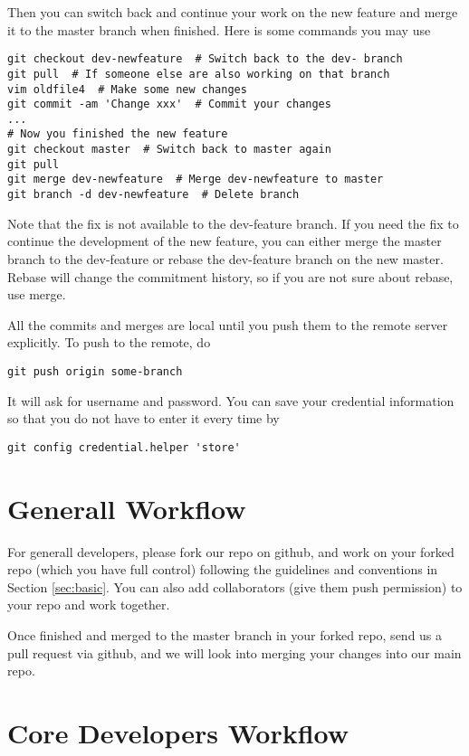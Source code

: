 \documentclass[runningheads,letterpaper]{llncs}
\begin{document}
Then you can switch back and continue your work on the new feature and merge it to the master branch when finished.
Here is some commands you may use
\begin{verbatim}
git checkout dev-newfeature  # Switch back to the dev- branch
git pull  # If someone else are also working on that branch
vim oldfile4  # Make some new changes
git commit -am 'Change xxx'  # Commit your changes
...
# Now you finished the new feature
git checkout master  # Switch back to master again
git pull
git merge dev-newfeature  # Merge dev-newfeature to master
git branch -d dev-newfeature  # Delete branch
\end{verbatim}

Note that the fix is not available to the dev-feature branch.
If you need the fix to continue the development of the new feature, you can either merge the master branch to the dev-feature or rebase the dev-feature branch on the new master.
Rebase will change the commitment history, so if you are not sure about rebase, use merge.

All the commits and merges are local until you push them to the remote server explicitly.
To push to the remote, do
\begin{verbatim}
git push origin some-branch
\end{verbatim}
It will ask for username and password.
You can save your credential information so that you do not have to enter it every time by
\begin{verbatim}
git config credential.helper 'store'
\end{verbatim}

\section{Generall Workflow}

For generall developers, please fork our repo on github, and work on your forked repo (which you have full control) following the guidelines and conventions in Section \ref{sec:basic}.
You can also add collaborators (give them push permission) to your repo and work together.

Once finished and merged to the master branch in your forked repo, send us a pull request via github, and we will look into merging your changes into our main repo.

\section{Core Developers Workflow}
\end{document}
